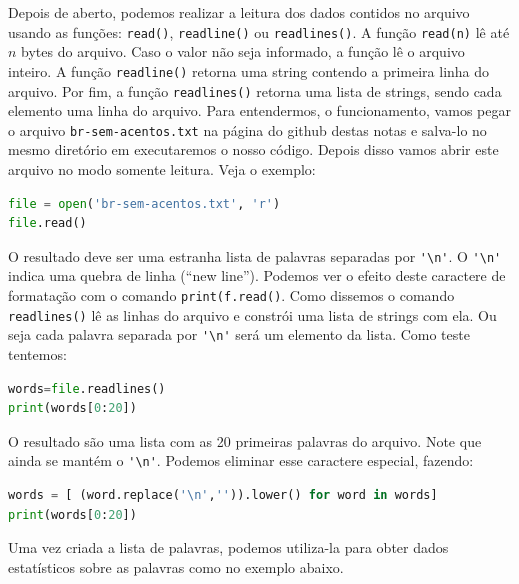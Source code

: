 Depois de aberto, podemos realizar a leitura dos dados contidos no arquivo usando as funções: {\tt read()}, {\tt readline()} ou {\tt readlines()}. A função {\tt read(n)} lê até $n$ bytes do arquivo. Caso o valor não seja informado, a função lê o arquivo inteiro. A função {\tt readline()} retorna uma string contendo a primeira linha do arquivo. Por fim, a função {\tt readlines()} retorna uma lista de strings, sendo cada elemento uma linha do arquivo. Para entendermos, o funcionamento, vamos pegar o arquivo {\tt br-sem-acentos.txt} na página do github destas notas e salva-lo no mesmo diretório em executaremos o nosso código. Depois disso vamos abrir este arquivo no modo somente leitura. Veja o exemplo:
\begin{lstlisting}[language=Python]
file = open('br-sem-acentos.txt', 'r')
file.read()
\end{lstlisting}
O resultado deve ser uma estranha lista de palavras separadas por \lstinline{'\n'}. O \lstinline{'\n'} indica uma quebra de linha (``new line''). Podemos ver o efeito deste caractere de formatação com o comando {\tt print(f.read()}. Como dissemos o comando {\tt readlines()} lê as linhas do arquivo e constrói uma lista de strings com ela. Ou seja cada palavra separada por \lstinline{'\n'} será um elemento da lista. Como teste tentemos:
\begin{lstlisting}[language=Python]
words=file.readlines()
print(words[0:20])
\end{lstlisting}
O resultado são uma lista com as 20 primeiras palavras do arquivo. Note que ainda se mantém o \lstinline{'\n'}. Podemos eliminar esse caractere especial, fazendo:
\begin{lstlisting}[language=Python]
words = [ (word.replace('\n','')).lower() for word in words]
print(words[0:20])
\end{lstlisting}

Uma vez criada a lista de palavras, podemos utiliza-la para obter dados estatísticos sobre as palavras como no exemplo abaixo.

